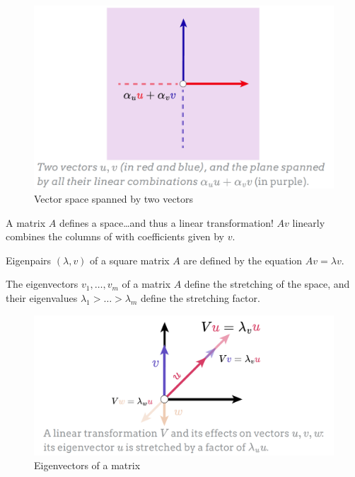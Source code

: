 \begin{figure}[htbp]
   \centering
   \includegraphics{images/02/span.png}
   \caption{Vector space spanned by two vectors}
   \label{fig:02/span}
\end{figure}

A matrix $A$ defines a space\dots and thus a linear
transformation! $Av$ linearly combines the columns of
with coefficients given by $v$.

\begin{paracol}{2}
   
   Eigenpairs $(\lambda, v)$ of a square matrix $A$ are defined by the equation $Av = \lambda v$.
   
   The eigenvectors $v_1,\dots,v_m$ of a matrix $A$ define the stretching of the space, and
   their eigenvalues $\lambda_1 > \dots > \lambda_m$ define the stretching factor.

   \switchcolumn

   \begin{figure}[htbp]
      \centering
      \includegraphics{images/02/eigenvector.png}
      \caption{Eigenvectors of a matrix}
      \label{fig:eigenvector}
   \end{figure}
\end{paracol}

